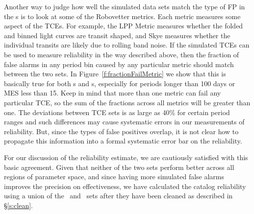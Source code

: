 Another way to judge how well the simulated data sets match the type of FP in the \opstce s is to look at some of the Robovetter metrics.  Each metric measures some aspect of the TCEs. For example, the LPP Metric measures whether the folded and binned light curves are transit shaped, and Skye measures whether the individual transits are likely due to rolling band noise.  If the simulated TCEs can be used to measure reliability in the way described above, then the fraction of false alarms in any period bin caused by any particular metric should match between the two sets.  In Figure~\ref{f:fractionFailMetric} we show that this is basically true for both \invtce s and \scrtce s, especially for periods longer than 100 days or MES less than 15.  Keep in mind that more than one metric can fail any particular TCE, so the sum of the fractions across all metrics will be greater than one.  The deviations between TCE sets is as large as 40\% for certain period ranges and such differences may cause systematic errors in our measurements of reliability.  But, since the types of false positives overlap, it is not clear how to propagate this information into a formal systematic error bar on the reliability.  

For our discussion of the reliability estimate, we are cautiously satisfied with this basic agreement. Given that neither of the two sets perform better across all regions of parameter space, and since having more simulated false alarms improves the precision on effectiveness,  we have calculated the catalog reliability using a union of the \scrtce\ and \invtce\ sets after they have been cleaned as described in \S\ref{s:clean}.  



